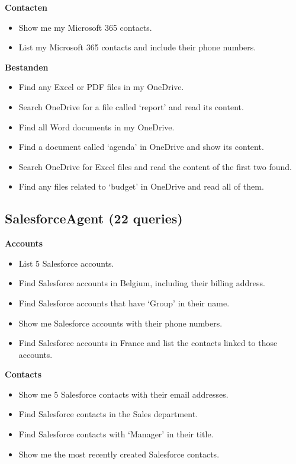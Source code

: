 \begin{appendices}
\textbf{Contacten}
\begin{itemize}[noitemsep]
  \item Show me my Microsoft 365 contacts.
  \item List my Microsoft 365 contacts and include their phone numbers.
\end{itemize}

\textbf{Bestanden}
\begin{itemize}[noitemsep]
  \item Find any Excel or PDF files in my OneDrive.
  \item Search OneDrive for a file called `report' and read its content.
  \item Find all Word documents in my OneDrive.
  \item Find a document called `agenda' in OneDrive and show its content.
  \item Search OneDrive for Excel files and read the content of the first two found.
  \item Find any files related to `budget' in OneDrive and read all of them.
\end{itemize}

\subsection*{SalesforceAgent (22 queries)}

\textbf{Accounts}
\begin{itemize}[noitemsep]
  \item List 5 Salesforce accounts.
  \item Find Salesforce accounts in Belgium, including their billing address.
  \item Find Salesforce accounts that have `Group' in their name.
  \item Show me Salesforce accounts with their phone numbers.
  \item Find Salesforce accounts in France and list the contacts linked to those accounts.
\end{itemize}

\textbf{Contacts}
\begin{itemize}[noitemsep]
  \item Show me 5 Salesforce contacts with their email addresses.
  \item Find Salesforce contacts in the Sales department.
  \item Find Salesforce contacts with `Manager' in their title.
  \item Show me the most recently created Salesforce contacts.
\end{itemize}


\end{appendices}
